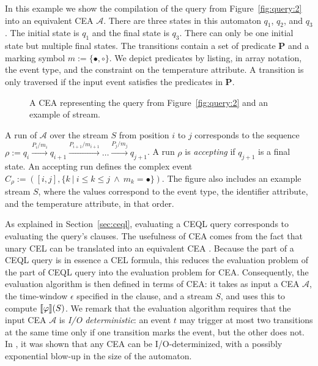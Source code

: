 \begin{example}
  In this example we show the compilation of the query from Figure~\ref{fig:query:2} into an equivalent CEA $\mathcal{A}$. There are three states in this automaton $q_{1}$, $q_{2}$, and $q_{3}$. The initial state is $q_{1}$ and the final state is $q_{3}$. There can only be one initial state but multiple final states. The transitions contain a set of predicate \textbf{P} and a marking symbol $m := \{\bullet, \circ\}$. We depict predicates by listing, in array notation, the event type, and the constraint on the temperature attribute. A transition is only traversed if the input event satisfies the predicates in \textbf{P}.

  \begin{figure}[H]
    \centering
    \begin{subfigure}[b]{\textwidth}
      \centering
      \vspace*{2em}
    \end{subfigure}
    \begin{subfigure}[t]{\textwidth}
      \centering
    \end{subfigure}

    \caption{A CEA representing the query from Figure~\ref{fig:query:2} and an example of stream.}
    \label{fig:cea}
  \end{figure}

  A run of $\mathcal{A}$ over the stream $S$ from position $i$ to $j$ corresponds to the sequence $\rho := q_{i} \xrightarrow[]{P_{i}/m_{i}} q_{i+1} \xrightarrow[]{P_{i+1}/m_{i+1}} \ldots \xrightarrow[]{P_{j}/m_{j}} q_{j+1}$. A run $\rho$ is \emph{accepting} if $q_{j+1}$ is a final state. An accepting run defines the complex event $C_{\rho} := ([i, j], \{ k \ | \ i \le k \le j \ \land \ m_{k} = \bullet \})$. The figure also includes an example stream $S$, where the values correspond to the event type, the identifier attribute, and the temperature attribute, in that order.
\end{example}

As explained in Section~\ref{sec:ceql}, evaluating a CEQL query corresponds to evaluating the query's  clauses. The usefulness of CEA comes from the fact that unary CEL can be translated into an equivalent CEA \cite{formal-framework-cep,formal-framework-cer}. Because the  part of a CEQL query is in essence a CEL formula, this reduces the evaluation problem of the  part of CEQL query into the evaluation problem for CEA. Consequently, the evaluation algorithm is then defined in terms of CEA: it takes as input a CEA $\mathcal{A}$, the time-window $\epsilon$ specified in the  clause, and a stream $S$, and uses this to compute $\llbracket \varphi \rrbracket(S)$. We remark that the evaluation algorithm requires that the input CEA $\mathcal{A}$ is \emph{I/O deterministic}: an event $t$ may trigger at most two transitions at the same time only if one transition marks the event, but the other does not. In \cite{formal-framework-cep,formal-framework-cer}, it was shown that any CEA can be I/O-determinized, with a possibly exponential blow-up in the size of the automaton.

